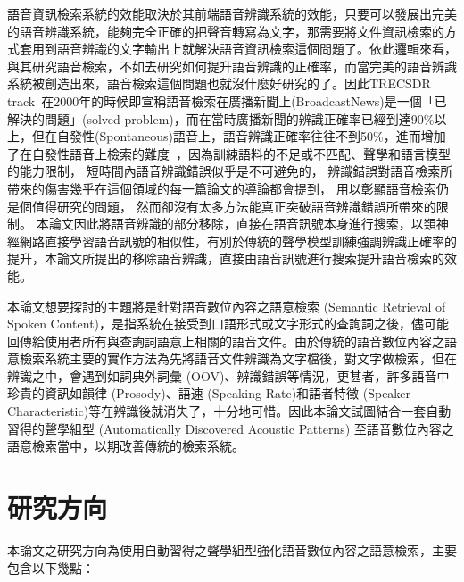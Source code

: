 語音資訊檢索系統的效能取決於其前端語音辨識系統的效能，只要可以發展出完美的語音辨識系統，能夠完全正確的把聲音轉寫為文字，那需要將文件資訊檢索的方式套用到語音辨識的文字輸出上就解決語音資訊檢索這個問題了。依此邏輯來看，與其研究語音檢索，不如去研究如何提升語音辨識的正確率，而當完美的語音辨識系統被創造出來，語音檢索這個問題也就沒什麼好研究的了。因此TRECSDR track~\cite{trec}在2000年的時候即宣稱語音檢索在廣播新聞上(BroadcastNews)是一個「已解決的問題」(solved problem)，而在當時廣播新聞的辨識正確率已經到達90\%以上，但在自發性(Spontaneous)語音上，語音辨識正確率往往不到50\%，進而增加了在自發性語音上檢索的難度~\cite{saraclar2004lattice,mamou2006spoken}，因為訓練語料的不足或不匹配、聲學和語言模型的能力限制， 短時間內語音辨識錯誤似乎是不可避免的， 辨識錯誤對語音檢索所帶來的傷害幾乎在這個領域的每一篇論文的導論都會提到， 用以彰顯語音檢索仍是個值得研究的問題， 然而卻沒有太多方法能真正突破語音辨識錯誤所帶來的限制。 本論文因此將語音辨識的部分移除，直接在語音訊號本身進行搜索，以類神經網路直接學習語音訊號的相似性，有別於傳統的聲學模型訓練強調辨識正確率的提升，本論文所提出的移除語音辨識，直接由語音訊號進行搜索提升語音檢索的效能。

本論文想要探討的主題將是針對語音數位內容之語意檢索 (Semantic Retrieval of Spoken Content)，是指系統在接受到口語形式或文字形式的查詢詞之後，儘可能回傳給使用者所有與查詢詞語意上相關的語音文件。由於傳統的語音數位內容之語意檢索系統主要的實作方法為先將語音文件辨識為文字檔後，對文字做檢索，但在辨識之中，會遇到如詞典外詞彙
(OOV)、辨識錯誤等情況，更甚者，許多語音中珍貴的資訊如韻律 (Prosody)、語速 (Speaking Rate)和語者特徵 (Speaker Characteristic)等在辨識後就消失了，十分地可惜。因此本論文試圖結合一套自動習得的聲學組型 (Automatically Discovered Acoustic Patterns) 至語音數位內容之語意檢索當中，以期改善傳統的檢索系統。

\section{研究方向}
本論文之研究方向為使用自動習得之聲學組型強化語音數位內容之語意檢索，主要包含以下幾點：

